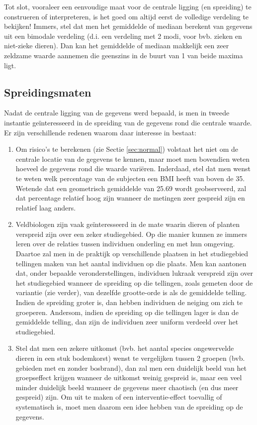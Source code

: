 \documentclass[
  12pt,dutch]{book}
\providecommand{\tightlist}{%
  \setlength{\itemsep}{0pt}\setlength{\parskip}{0pt}}
\theoremstyle{definition}
\theoremstyle{definition}
\theoremstyle{definition}
\theoremstyle{definition}
\theoremstyle{remark}
\begin{document}
Tot slot, vooraleer een eenvoudige maat voor de centrale ligging (en
spreiding) te construeren of interpreteren, is het goed om altijd eerst de
volledige verdeling te bekijken! Immers, stel dat men het gemiddelde of
mediaan berekent van gegevens uit een bimodale verdeling (d.i. een verdeling
met 2 modi, voor bvb. zieken en niet-zieke dieren). Dan kan het gemiddelde of
mediaan makkelijk een zeer zeldzame waarde aannemen die geenszins in de
buurt van 1 van beide maxima ligt.

\subsection{Spreidingsmaten}\label{subsec:spreiding}

Nadat de centrale ligging van de gegevens werd bepaald, is men in tweede
instantie geïnteresseerd in de spreiding van de gegevens rond
die centrale waarde. Er zijn verschillende redenen waarom daar interesse in bestaat:

\begin{enumerate}
\def\labelenumi{\arabic{enumi}.}
\tightlist
\item
  Om risico's te berekenen (zie Sectie \ref{sec:normal}) volstaat het niet om de centrale locatie van de gegevens te kennen, maar moet men bovendien weten hoeveel de gegevens rond die waarde variëren. Inderdaad, stel dat men wenst te weten welk percentage van de subjecten een BMI heeft van boven de 35. Wetende dat een geometrisch gemiddelde van 25.69 wordt geobserveerd, zal dat percentage relatief hoog zijn wanneer de metingen zeer gespreid zijn en relatief laag anders.
\item
  Veldbiologen zijn vaak geïnteresseerd in de mate waarin dieren of planten verspreid zijn over een zeker studiegebied. Op die manier kunnen ze immers leren over de relaties tussen individuen onderling en met hun omgeving. Daartoe zal men in de praktijk op verschillende plaatsen in het studiegebied tellingen maken van het aantal individuen op die plaats. Men kan aantonen dat, onder bepaalde veronderstellingen, individuen lukraak verspreid zijn over het studiegebied wanneer de spreiding op die tellingen, zoals gemeten door de variantie (zie verder), van dezelfde grootte-orde is als de gemiddelde telling. Indien de spreiding groter is, dan hebben individuen de neiging om zich te groeperen. Andersom, indien de spreiding op die tellingen lager is dan de gemiddelde telling, dan zijn de individuen zeer uniform verdeeld over het studiegebied.
\item
  Stel dat men een zekere uitkomst (bvb. het aantal species ongewervelde dieren in een stuk bodemkorst) wenst te vergelijken tussen 2 groepen (bvb. gebieden met en zonder bosbrand), dan zal men een duidelijk beeld van het groepseffect krijgen wanneer de uitkomst weinig gespreid is, maar een veel minder duidelijk beeld wanneer de gegevens meer chaotisch (en dus meer gespreid) zijn. Om uit te maken of een interventie-effect toevallig of systematisch is, moet men daarom een idee hebben van de spreiding op de gegevens.
\end{enumerate}
\end{document}
